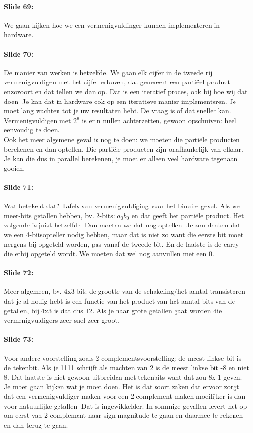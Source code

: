 \documentclass[10pt,a4paper]{book}
\begin{document}
\paragraph{Slide 69:} We gaan kijken hoe we een vermenigvuldinger kunnen implementeren in hardware.

\paragraph{Slide 70:} De manier van werken is hetzelfde. We gaan elk cijfer in de tweede rij vermenigvuldigen met het cijfer erboven, dat genereert een parti\"eel product enzovoort en dat tellen we dan op. Dat is een iteratief proces, ook bij hoe wij dat doen. Je kan dat in hardware ook op een iteratieve manier implementeren. Je moet lang wachten tot je uw resultaten hebt. De vraag is of dat sneller kan. Vermenigvuldigen met $2^n$ is er n nullen achterzetten, gewoon opschuiven: heel eenvoudig te doen.\\
Ook het meer algemene geval is nog te doen: we moeten die parti\"ele producten berekenen en dan optellen. Die parti\"ele producten zijn onafhankelijk van elkaar. Je kan die dus in parallel berekenen, je moet er alleen veel hardware tegenaan gooien.

\paragraph{Slide 71:} Wat betekent dat? Tafels van vermenigvuldiging voor het binaire geval. Als we meer-bits getallen hebben, bv. 2-bits: $a_0b_0$ en dat geeft het parti\"ele product. Het volgende is juist hetzelfde. Dan moeten we dat nog optellen. Je zou denken dat we een 4-bitsopteller nodig hebben, maar dat is niet zo want die eerste bit moet nergens bij opgeteld worden, pas vanaf de tweede bit. En de laatste is de carry die erbij opgeteld wordt. We moeten dat wel nog aanvullen met een 0.

\paragraph{Slide 72:} Meer algemeen, bv. 4x3-bit: de grootte van de schakeling/het aantal transistoren dat je al nodig hebt is een functie van het product van het aantal bits van de getallen, bij 4x3 is dat dus 12. Als je naar grote getallen gaat worden die vermenigvuldigers zeer snel zeer groot.

\paragraph{Slide 73:} Voor andere voorstelling zoals 2-complementsvoorstelling: de meest linkse bit is de tekenbit. Als je 1111 schrijft als machten van 2 is de meest linkse bit -8 en niet 8. Dat laatste is niet gewoon uitbreiden met tekenbits want dat zou 8x-1 geven. Je moet gaan kijken wat je moet doen. Het is dat soort zaken dat ervoor zorgt dat een vermenigvuldiger maken voor een 2-complement maken moeilijker is dan voor natuurlijke getallen. Dat is ingewikkelder. In sommige gevallen levert het op om eerst van 2-complement naar sign-magnitude te gaan en daarmee te rekenen en dan terug te gaan.
\end{document}
